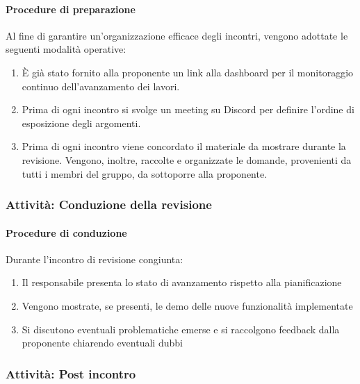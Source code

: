 \documentclass[a4paper,12pt]{article}
\begin{document}
\paragraph{Procedure di preparazione}
Al fine di garantire un'organizzazione efficace degli incontri, vengono adottate le seguenti modalità operative:
\begin{enumerate}
    \item È già stato fornito alla proponente un link alla dashboard per il monitoraggio continuo dell'avanzamento dei lavori.
    \item Prima di ogni incontro si svolge un meeting su Discord per definire l'ordine di esposizione degli argomenti.
    \item Prima di ogni incontro viene concordato il materiale da mostrare durante la revisione. Vengono, inoltre, raccolte e organizzate le domande, 
    provenienti da tutti i membri del gruppo, da sottoporre alla proponente.
\end{enumerate}

\subsubsection{Attività: Conduzione della revisione}\label{conduzione_revisione}

\paragraph{Procedure di conduzione}
Durante l'incontro di revisione congiunta:
\begin{enumerate}
    \item Il responsabile presenta lo stato di avanzamento rispetto alla pianificazione
    \item Vengono mostrate, se presenti, le demo delle nuove funzionalità implementate
    \item Si discutono eventuali problematiche emerse e si raccolgono feedback dalla proponente chiarendo eventuali dubbi
\end{enumerate}

\subsubsection{Attività: Post incontro}\label{post_incontro}
\end{document}
